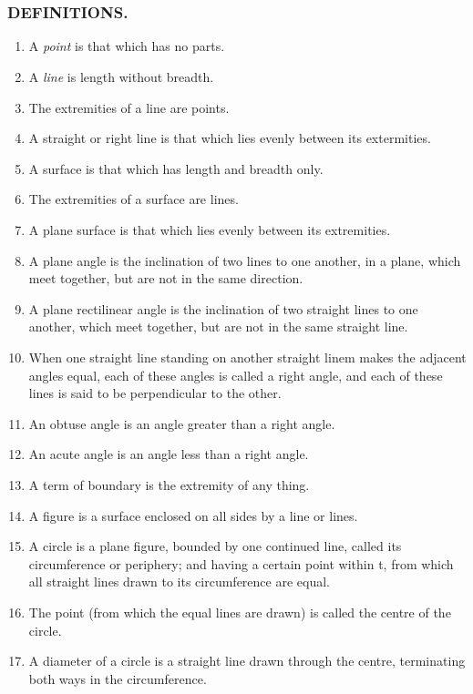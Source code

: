 
		\chapter{}
		\centering\subsection*{DEFINITIONS.}
		\begin{enumerate}[I]
			\item A \textit{point} is that which has no parts.
			\item A \textit{line} is length without breadth.
			\item The extremities of a line are points. 
			\item A straight or right line is that which lies evenly between its extermities. 
			\item A surface is that which has length and breadth only. 
			\item The extremities of a surface are lines.
			\item A plane surface is that which lies evenly between its extremities. 
			\item A plane angle is the inclination of two lines to one another, in a plane, which meet together, but are not in the same direction. 
			\item A plane rectilinear angle is the inclination of two straight lines to one another, which meet together, but are not in the same straight line.
			\item When one straight line standing on another straight linem makes the adjacent angles equal, each of these angles is called a right angle, and each of these lines is said to be perpendicular to the other. 
			\item An obtuse angle is an angle greater than a right angle.
			\item An acute angle is an angle less than a right angle. 
			\item A term of boundary is the extremity of any thing. 
			\item A figure is a surface enclosed on all sides by a line or lines. 
			\item A circle is a plane figure, bounded by one continued line, called its circumference or periphery; and having a certain point within t, from which all straight lines drawn to its circumference are equal. 
			\item The point (from which the equal lines are drawn) is called the centre of the circle. 
			\item A diameter of a circle is a straight line drawn through the centre, terminating both ways in the circumference. 

\end{enumerate}
